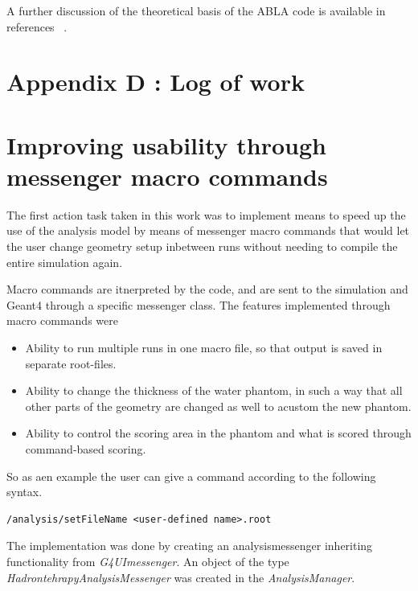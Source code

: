 A further discussion of the theoretical basis of the ABLA code is available in references ~\cite{ablatalk,iia}.

\clearpage

\section*{Appendix D \label{AppendixD}: Log of work}

\renewcommand{\theequation}{D\arabic{equation}}
\setcounter{equation}{0}  
\renewcommand{\thefigure}{D\arabic{figure}}
\setcounter{figure}{0}
\renewcommand{\thetable}{D\arabic{table}}
\setcounter{table}{0}
\renewcommand{\thesection}{D}
\setcounter{section}{1}
\section*{Improving usability through messenger macro commands \label{logofwork}}

The first action task taken in this work was to implement means to speed up the use of the analysis model by means of messenger macro commands that would let the user change geometry setup inbetween runs without needing to compile the entire simulation again.

Macro commands are itnerpreted by the code, and are sent to the simulation and Geant4 through a specific messenger class. The features implemented through macro commands were
\begin{itemize}
 \item Ability to run multiple runs in one macro file, so that output is saved in separate root-files.
\item Ability to change the thickness of the water phantom, in such a way that all other parts of the geometry are changed as well to acustom the new phantom.
\item Ability to control the scoring area in the phantom and what is scored through command-based scoring.
\end{itemize}


So as aen example the user can give a command according to the following syntax.
\scriptsize
\begin{verbatim}
/analysis/setFileName <user-defined name>.root
\end{verbatim}
\normalsize

The implementation was done by creating an analysismessenger inheriting functionality from \textit{G4UImessenger}. An object of the type \textit{HadrontehrapyAnalysisMessenger} was created in the \textit{AnalysisManager}.


